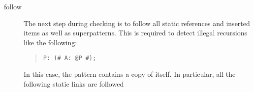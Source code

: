 \begin{description}
%
\item[follow] The next step during checking is to follow all
    static references and inserted items as well as
    superpatterns.  This is required to detect illegal recursions
    like the following:
    \begin{quote}\begin{verbatim}P: (# A: @P #);
\end{verbatim}\end{quote}
    In this case, the pattern  contains a copy of itself.
    In particular, all the following static links are followed

\end{description}
